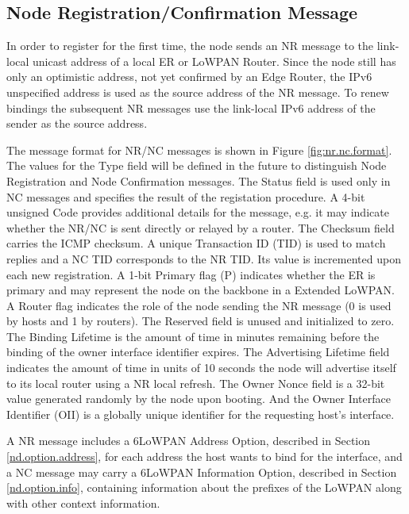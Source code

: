 \subsection{Node Registration/Confirmation Message}
In order to register for the first time, the node sends an NR message to the link-local unicast address of a local ER or LoWPAN Router. Since the node still has only an optimistic address, not yet confirmed by an Edge Router, the IPv6 unspecified address is used as the source address of the NR message. To renew bindings the subsequent NR messages use the link-local IPv6 address of the sender as the source address.

The message format for NR/NC messages is shown in Figure \ref{fig:nr.nc.format}. The values for the Type field will be defined in the future to distinguish Node Registration and Node Confirmation messages. The Status field is used only in NC messages and specifies the result of the registation procedure. A 4-bit unsigned Code provides additional details for the message, e.g. it may indicate whether the NR/NC is sent directly or relayed by a router. The Checksum field carries the ICMP checksum. A unique Transaction ID (TID) is used to match replies and a NC TID corresponds to the NR TID. Its value is incremented upon each new registration. A 1-bit Primary flag (P) indicates whether the ER is primary and may represent the node on the backbone in a Extended LoWPAN. A Router flag indicates the role of the node sending the NR message (0 is used by hosts and 1 by routers).  The Reserved field is unused and initialized to zero. The Binding Lifetime is the amount of time in minutes remaining before the binding of the owner interface identifier expires. The Advertising Lifetime field indicates the amount of time in units of 10 seconds the node will advertise itself to its local router using a NR local refresh. The Owner Nonce field is a 32-bit value generated randomly by the node upon booting.
And the Owner Interface Identifier (OII) is a globally unique identifier for the requesting host's interface.

A NR message includes a 6LoWPAN  Address Option, described in Section \ref{nd.option.address}, for each address the host wants to bind for the interface, and a NC message may carry a 6LoWPAN Information Option, described in Section \ref{nd.option.info}, containing information about the prefixes of the LoWPAN along with other context information.

